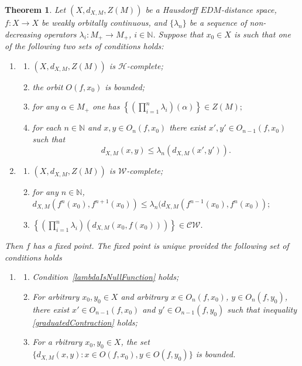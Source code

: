 \documentclass[12pt]{amsart}          %
\newtheorem{theorem}{Theorem}
\newcommand{\NN}{\mathbb N}
\begin{document}
\begin{theorem}\label{th::contraction1}
Let $(X,d_{X,M}, Z(M))$ be a Hausdorff $EDM$-distance space, $f\colon X\to X$ be weakly orbitally continuous, and  $\{ \lambda_n\}$ be a sequence of non-decreasing operators $\lambda_i\colon M_+\to M_+$, $i\in\NN$. Suppose that $x_0\in X$ is such that  one of the following two sets of conditions holds:
\begin{enumerate}[label = \Roman*]
    \item\label{firstSet}
    \begin{enumerate}
        \item $(X,d_{X,M}, Z(M))$ is $\mathcal{H}$-complete;
        \item  the orbit $O(f,x_0)$ is bounded; 
   \item\label{lambdaIsNullFunction}  for any $\alpha\in M_+$ one has $\left\{ \left(\prod_{i=1}^n\lambda_i\right)(\alpha)\right\}\in Z(M);
    $
    \item for each $n\in\NN$ and $x,y\in  O_n(f, x_0)$ there exist $x',y'\in O_{n-1}(f, x_0)$ such that 
    \begin{equation}\label{graduatedContraction}
         d_{X,M}(x,y)\leq \lambda_n(d_{X,M}(x',y')).
    \end{equation}
    \end{enumerate}
\item\label{secondSet}
    \begin{enumerate}
    \item $(X,d_{X,M}, Z(M))$ is $\mathcal{W}$-complete;
    \item for any $n\in \NN$,
$
    d_{X,M}(f^n(x_0),f^{n+1}(x_0))\leq \lambda_n(d_{X,M}(f^{n-1}(x_0),f^n(x_0));
$
\item\label{seriesConvergence}
$
\left\{\left(\prod_{i=1}^n\lambda_i\right)(d_{X,M}(x_0, f(x_0)))\right\}\in\mathcal{CW}.
$
\end{enumerate}
\end{enumerate}
Then $f$ has a fixed point.
The fixed point is unique provided the following set of conditions holds
\begin{enumerate}[label =\Roman*,resume]
    \item\label{uniquenessConditions} 
    \begin{enumerate}
    \item Condition~\eqref{lambdaIsNullFunction} holds;     
        \item\label{wContractionB}  For arbitrary  $x_0,y_0\in X$  and arbitrary $x\in  O_n(f, x_0)$, $y\in  O_n(f, y_0)$, there exist $x'\in O_{n-1}(f, x_0)$ and $y'\in O_{n-1}(f, y_0)$ such that inequality \eqref{graduatedContraction} holds;
        \item\label{boundednessOfOrbitPairs}  For a rbitrary  $x_0,y_0\in X$, the set $\{d_{X,M}(x,y)\colon x\in  O(f, x_0),y\in  O(f, y_0)\}$ is bounded.
    \end{enumerate}
\end{enumerate}
\end{theorem}
\end{document}

